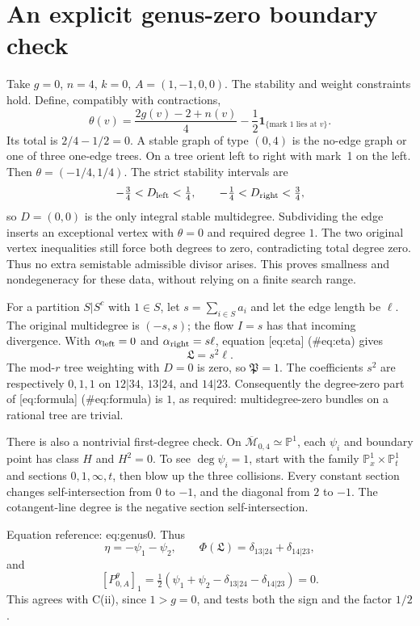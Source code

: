 \documentclass[10pt]{article}
\begin{document}
\section*{An explicit genus-zero boundary check}
Take \(g=0\), \(n=4\), \(k=0\), \(A=(1,-1,0,0)\). The stability and weight constraints hold. Define, compatibly with contractions, \[\theta(v)=\frac{2g(v)-2+n(v)}4
           -\frac12\mathbf 1_{\{\text{mark }1\text{ lies at }v\}}.\] Its total is \(2/4-1/2=0\). A stable graph of type \((0,4)\) is the no-edge graph or one of three one-edge trees. On a tree orient left to right with mark 1 on the left. Then \(\theta=(-1/4,1/4)\). The strict stability intervals are \[-\tfrac34<D_{\rm left}<\tfrac14,\qquad
 -\tfrac14<D_{\rm right}<\tfrac34,\] so \(D=(0,0)\) is the only integral stable multidegree. Subdividing the edge inserts an exceptional vertex with \(\theta=0\) and required degree \(1\). The two original vertex inequalities still force both degrees to zero, contradicting total degree zero. Thus no extra semistable admissible divisor arises. This proves smallness and nondegeneracy for these data, without relying on a finite search range.\par
For a partition \(S|S^c\) with \(1\in S\), let \(s=\sum_{i\in S}a_i\) and let the edge length be \(\ell\). The original multidegree is \((-s,s)\); the flow \(I=s\) has that incoming divergence. With \(\alpha_{\rm left}=0\) and \(\alpha_{\rm right}=s\ell\), equation [eq:eta] (\#eq:eta) gives \[\mathfrak L=s^2\ell.\] The mod-\(r\) tree weighting with \(D=0\) is zero, so \(\mathfrak P=1\). The coefficients \(s^2\) are respectively \(0,1,1\) on \(12|34\), \(13|24\), and \(14|23\). Consequently the degree-zero part of [eq:formula] (\#eq:formula) is \(1\), as required: multidegree-zero bundles on a rational tree are trivial.\par
There is also a nontrivial first-degree check. On \(\overline{\mathcal M}_{0,4}\simeq\mathbb P^1\), each \(\psi_i\) and boundary point has class \(H\) and \(H^2=0\). To see \(\deg\psi_i=1\), start with the family \(\mathbb P^1_x\times\mathbb P^1_t\) and sections \(0,1,\infty,t\), then blow up the three collisions. Every constant section changes self-intersection from \(0\) to \(-1\), and the diagonal from \(2\) to \(-1\). The cotangent-line degree is the negative section self-intersection.\par
Equation reference: eq:genus0. Thus \[\eta=-\psi_1-\psi_2,\qquad
 \Phi(\mathfrak L)=\delta_{13|24}+\delta_{14|23},\] and \[
 [P^\theta_{0,A}]_1
 =\tfrac12(\psi_1+\psi_2-\delta_{13|24}-\delta_{14|23})=0.\] This agrees with C(ii), since \(1>g=0\), and tests both the sign and the factor \(1/2\).\par
\end{document}

